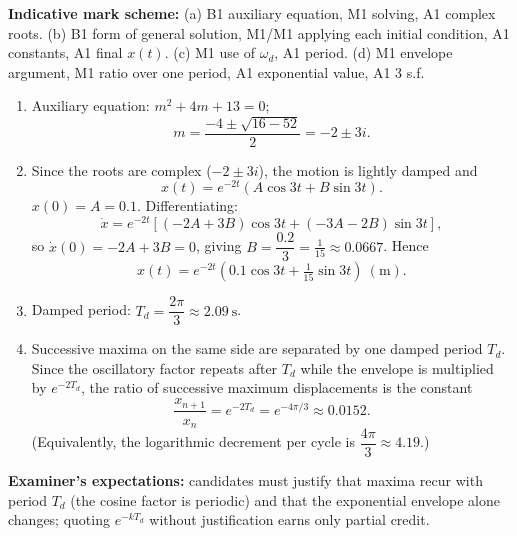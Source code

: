 \documentclass[11pt]{article}
\begin{document}
\begin{corrige}
\textbf{Indicative mark scheme:} (a) B1 auxiliary equation, M1 solving, A1 complex roots. (b) B1 form of general solution, M1/M1 applying each initial condition, A1 constants, A1 final $x(t)$. (c) M1 use of $\omega_d$, A1 period. (d) M1 envelope argument, M1 ratio over one period, A1 exponential value, A1 3 s.f.

\begin{enumerate}
\item Auxiliary equation: $m^2 + 4m + 13 = 0$;
\[
m = \frac{-4 \pm \sqrt{16 - 52}}{2} = -2 \pm 3i.
\]
\item Since the roots are complex ($-2 \pm 3i$), the motion is lightly damped and
\[
x(t) = e^{-2t}\left(A\cos 3t + B\sin 3t\right).
\]
$x(0) = A = 0.1$. Differentiating:
\[
\dot{x} = e^{-2t}\left[(-2A + 3B)\cos 3t + (-3A - 2B)\sin 3t\right],
\]
so $\dot{x}(0) = -2A + 3B = 0$, giving $B = \dfrac{0.2}{3} = \tfrac{1}{15} \approx 0.0667$. Hence
\[
x(t) = e^{-2t}\left(0.1\cos 3t + \tfrac{1}{15}\sin 3t\right)\ \mathrm{(m)}.
\]
\item Damped period: $T_d = \dfrac{2\pi}{3} \approx 2.09\ \mathrm{s}$.
\item Successive maxima on the same side are separated by one damped period $T_d$. Since the oscillatory factor repeats after $T_d$ while the envelope is multiplied by $e^{-2T_d}$, the ratio of successive maximum displacements is the constant
\[
\frac{x_{n+1}}{x_n} = e^{-2T_d} = e^{-4\pi/3} \approx 0.0152.
\]
(Equivalently, the logarithmic decrement per cycle is $\dfrac{4\pi}{3} \approx 4.19$.)
\end{enumerate}
\textbf{Examiner's expectations:} candidates must justify that maxima recur with period $T_d$ (the cosine factor is periodic) and that the exponential envelope alone changes; quoting $e^{-kT_d}$ without justification earns only partial credit.
\end{corrige}
\end{document}

